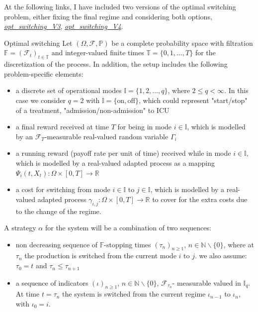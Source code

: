 \documentclass{article}
\begin{document}
At the following links, I have included two versions of the optimal switching problem, either fixing the final regime and considering both options, \href{https://github.com/claudia-viaro/optimal_stopping-switching/blob/main/opt_switching_V3.ipynb}{\textit{opt\_switching\_V3}}, \href{https://github.com/claudia-viaro/optimal_stopping-switching/blob/main/opt_switching_V4.ipynb}{\textit{opt\_switching\_V4}}.


\begin{definition}{Optimal switching}{}
Let $(\Omega, \mathcal{F}, \mathbb{P})$ be a complete probability space with filtration $\mathbb{F}=(\mathcal{F}_t)_{t \in \mathbb{T}}$ and integer-valued finite times $\mathbb{T}=\{0, 1, \ldots, T \}$ for the discretization of the process. In addition, the setup includes the following problem-specific elements:
\begin{itemize}
    \item a discrete set of operational modes $\mathbb{I} = \{1, 2, \ldots, q  \}$, where $2 \leq q < \infty$. In this case we consider $q=2$ with $\mathbb{I}=\{\text{on}, \text{off} \}$, which could represent "start/stop" of a treatment, "admission/non-admission" to ICU
    \item a final reward received at time $T$ for being in mode $i \in \mathbb{I}$, which is modelled by an $\mathcal{F}_T$-measurable real-valued random variable $\Gamma_i$
    \item a running reward (payoff rate per unit of time) received while in mode $i \in \mathbb{I}$, which is modelled by a real-valued adapted process as a mapping $\Psi_i(t, X_t): \Omega \times [0, T] \rightarrow \mathbb{R}$
    \item a cost for switching from mode $i \in \mathbb{I}$ to $j \in \mathbb{I}$, which is modelled by a real-valued adapted process $\gamma_{i, j} : \Omega \times [0, T] \rightarrow \mathbb{R} $ to cover for the extra costs due to the change of the regime.
\end{itemize}
\end{definition}
A strategy $\alpha$ for the system will be a combination of two sequences:
\begin{itemize}
    \item non decreasing sequence of $\mathbb{F}$-stopping times $(\tau_n)_{n \geq 1}$, $n \in \mathbb{N} \backslash \{0\}$, where at $\tau_n$ the production is switched from the current mode $i$ to $j$. we also assume: $\tau_0=t$ and $\tau_n \leq \tau_{n+1}$
    \item a sequence of indicators $(\iota)_{n \geq 1}$, $n \in \mathbb{N} \backslash \{0\}$, $\mathcal{F}_{\tau_n}$- measurable valued in $\mathbb{I}_q$. At time $t=\tau_n$ the system is switched from the current regime $\iota_{n-1}$ to $\iota_{n}$, with $\iota_{0}=i$.
\end{itemize}
\end{document}
